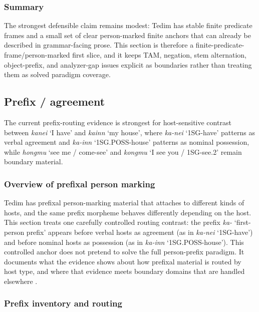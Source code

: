 \documentclass[
  11pt,
  a4paper,
]{article}
\newcommand{\tdim}[1]{\textit{#1}}
\newcommand{\glossquote}[1]{`#1'}
\begin{document}
\subsubsection{Summary}\label{summary-2}

The strongest defensible claim remains modest: Tedim has stable finite
predicate frames and a small set of clear person-marked finite anchors
that can already be described in grammar-facing prose. This section is
therefore a finite-predicate-frame/person-marked first slice, and it
keeps TAM, negation, stem alternation, object-prefix, and analyzer-gap
issues explicit as boundaries rather than treating them as solved
paradigm coverage.

\subsection{Prefix / agreement}\label{prefix-agreement}

The current prefix-routing evidence is strongest for host-sensitive
contrast between \tdim{kanei} \glossquote{I have} and \tdim{kainn}
\glossquote{my house}, where \tdim{ka-nei} \glossquote{1SG-have}
patterns as verbal agreement and \tdim{ka-inn}
\glossquote{1SG.POSS-house} patterns as nominal possession, while
\tdim{hongmu} \glossquote{see me / come-see} and \tdim{kongmu}
\glossquote{I see you / 1SG-see.2} remain boundary material.

\subsubsection{Overview of prefixal person
marking}\label{overview-of-prefixal-person-marking}

Tedim has prefixal person-marking material that attaches to different
kinds of hosts, and the same prefix morpheme behaves differently
depending on the host. This section treats one carefully controlled
routing contrast: the prefix \tdim{ka-} \glossquote{first-person prefix}
appears before verbal hosts as agreement (as in \tdim{ka-nei}
\glossquote{1SG-have}) and before nominal hosts as possession (as in
\tdim{ka-inn} \glossquote{1SG.POSS-house}). This controlled anchor does
not pretend to solve the full person-prefix paradigm. It documents what
the evidence shows about how prefixal material is routed by host type,
and where that evidence meets boundary domains that are handled
elsewhere \citep{henderson1965, zamngaihcing2017}.

\subsubsection{Prefix inventory and
routing}\label{prefix-inventory-and-routing}
\end{document}
